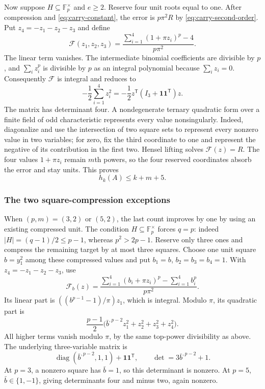 \documentclass[11pt]{amsart}
\theoremstyle{definition}
\numberwithin{equation}{section}
\begin{document}
Now suppose $H\subseteq\mathbb F_p^\times$ and $e\ge2$.
Reserve four unit roots equal to one. After compression and
\eqref{eq:carry-constant}, the error is $p\pi^2R$ by
\eqref{eq:carry-second-order}. Put $z_4=-z_1-z_2-z_3$ and define
\[
 \mathcal F(z_1,z_2,z_3)
   =\frac{\sum_{i=1}^4(1+\pi z_i)^p-4}{p\pi^2}.
\]
The linear term vanishes. The intermediate binomial coefficients
are divisible by $p$, and $\sum_i z_i^p$ is divisible by $p$ as
an integral polynomial because $\sum_i z_i=0$.
Consequently $\mathcal F$ is integral and reduces to
\[
 -\frac12\sum_{i=1}^4z_i^2
 =-\frac12 z^{\mathsf T}(I_3+\mathbf1\mathbf1^{\mathsf T})z.
\]
The matrix has determinant four. A nondegenerate ternary quadratic
form over a finite field of odd characteristic represents every
value nonsingularly. Indeed, diagonalize and use the intersection
of two square sets to represent every nonzero value in two variables;
for zero, fix the third coordinate to one and represent the negative
of its contribution in the first two. Hensel lifting solves
$\mathcal F(z)=R$. The four values $1+\pi z_i$ remain $m$th powers,
so the four reserved coordinates absorb the error and stay units.
This proves
\begin{equation}\label{eq:carry-odd-four-count}
 h_k(A)\le k+m+5.
\end{equation}

\subsubsection{The two square-compression exceptions}
\label{subsec:carry-two-exceptions}

When $(p,m)=(3,2)$ or $(5,2)$, the last count improves by one by
using an existing compressed unit. The condition
$H\subseteq\mathbb F_p^\times$ forces $q=p$: indeed
$|H|=(q-1)/2\le p-1$, whereas $p^2>2p-1$.
Reserve only three ones and compress the remaining target by at
most three squares. Choose one unit square $b=y_1^2$ among these
compressed values and put $b_1=b$, $b_2=b_3=b_4=1$.
With $z_4=-z_1-z_2-z_3$, use
\begin{equation}\label{eq:carry-existing-unit}
 \mathcal F_b(z)
   =\frac{\sum_{i=1}^4(b_i+\pi z_i)^p-\sum_{i=1}^4b_i^p}
          {p\pi^2}.
\end{equation}
Its linear part is $((b^{p-1}-1)/\pi)z_1$, which is integral.
Modulo $\pi$, its quadratic part is
\[
 \frac{p-1}{2}
   \bigl(\bar b^{,p-2}z_1^2+z_2^2+z_3^2+z_4^2\bigr).
\]
All higher terms vanish modulo $\pi$, by the same top-power
divisibility as above. The underlying three-variable matrix is
\[
 \operatorname{diag}(\bar b^{,p-2},1,1)
       +\mathbf1\mathbf1^{\mathsf T},
 \qquad \det=3\bar b^{,p-2}+1.
\]
At $p=3$, a nonzero square has $\bar b=1$, so this determinant is
nonzero. At $p=5$, $\bar b\in\{1,-1\}$, giving determinants four
and minus two, again nonzero.
\end{document}
